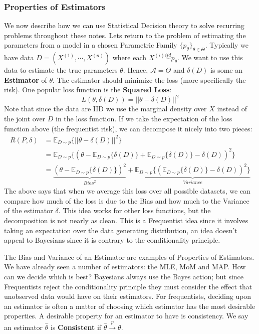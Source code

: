 \documentclass[]{article}
\theoremstyle{mattstyle}
\theoremstyle{definition}
\begin{document}
\subsubsection{Properties of Estimators}
We now describe how we can use Statistical Decision theory to solve recurring problems throughout these notes. Lets return to the problem of estimating the parameters from a model in a chosen Parametric Family $\{p_{\theta}\}_{\theta\in\Theta}$. Typically we have data \(D=(X^{(1)}, \cdots, X^{(n)})\) where each \(X^{(i)}\overset{iid}{\sim} p_{\theta}\). We want to use this data to estimate the true parameters \(\theta\). Hence, \(\mathcal{A} = \Theta\) and $\delta(D)$ is some an \textbf{Estimator} of \(\theta\). The estimator should minimize the loss (more specifically the risk). One popular loss function is the \textbf{Squared Loss}: 
$$L(\theta,\delta(D)) = ||\theta-\delta(D)||^2$$
Note that since the data are IID we use the marginal density over $X$ instead of the joint over $D$ in the loss function. If we take the expectation of the loss function above (the frequentist risk), we can decompose it nicely into two pieces:
\begin{align*}
R(P,\delta)&=\mathbb{E}_{D\sim p}\{||\theta-\delta(D)||^2\}\\
&=\mathbb{E}_{D\sim p}\{(\theta-\mathbb{E}_{D\sim p}\{\delta(D)\} + \mathbb{E}_{D\sim p}\{\delta(D)\} - \delta(D))^2\}\\
&=\underbrace{(\theta-\mathbb{E}_{D\sim p}\{\delta(D)\})^2}_{Bias^2} + \underbrace{\mathbb{E}_{D\sim p}\{(\mathbb{E}_{D\sim p}\{\delta(D)\} - \delta(D))^2\}}_{Variance}
\end{align*}
The above says that when we average this loss over all possible datasets, we can compare how much of the loss is due to the Bias and how much to the Variance of the estimator $\delta$. This idea works for other loss functions, but the decomposition is not nearly as clean. This is a Frequentist idea since it involves taking an expectation over the data generating distribution, an idea doesn't appeal to Bayesians since it is contrary to the conditionality principle.

The Bias and Variance of an Estimator are examples of Properties of Estimators. We have already seen a number of estimators: the MLE, MoM and MAP. How can we decide which is best? Bayesians always use the Bayes action; but since Frequentists reject the conditionality principle they must consider the effect that unobserved data would have on their estimators. For frequentists, deciding upon an estimator is often a matter of choosing which estimator has the most desirable properties. A desirable property for an estimator to have is consistency. We say an estimator $\hat{\theta}$ is \textbf{Consistent} if $\hat{\theta} \overset{p}{\rightarrow} \theta$.
\end{document}
